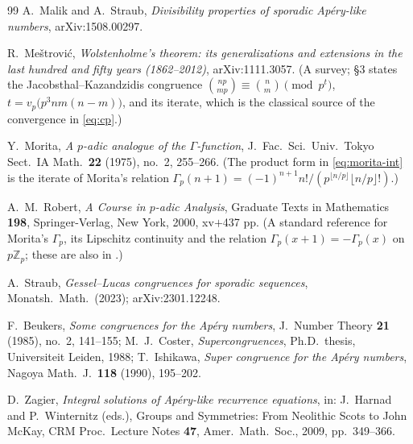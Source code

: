 \documentclass[11pt,reqno]{article}
\newcommand{\Zp}{\mathbb{Z}_p}
\newcommand{\Gp}{\Gamma_p}
\newcommand{\vp}{v_p}
\newcommand{\bin}[2]{\binom{#1}{#2}}
\newcommand{\floor}[1]{\lfloor #1 \rfloor}
\theoremstyle{plain}
\theoremstyle{definition}
\theoremstyle{remark}
\numberwithin{equation}{section}
\begin{document}
\begin{thebibliography}{99}
A.~Malik and A.~Straub,
\emph{Divisibility properties of sporadic Ap\'ery-like numbers},
arXiv:1508.00297.

R.~Me\v{s}trovi\'c,
\emph{Wolstenholme's theorem: its generalizations and extensions in the last
hundred and fifty years (1862--2012)},
arXiv:1111.3057.
(A survey; \S3 states the Jacobsthal--Kazandzidis congruence
$\bin{np}{mp}\equiv\bin nm\pmod{p^{t}}$, $t=\vp\bigl(p^3nm(n-m)\bigr)$, and its
iterate, which is the classical source of the convergence in \eqref{eq:cp}.)

Y.~Morita,
\emph{A $p$-adic analogue of the $\Gamma$-function},
J.\ Fac.\ Sci.\ Univ.\ Tokyo Sect.\ IA Math.\ \textbf{22} (1975), no.~2,
255--266.
(The product form in \eqref{eq:morita-int} is the iterate of Morita's relation
$\Gp(n+1)=(-1)^{n+1}n!/(p^{\floor{n/p}}\floor{n/p}!)$.)

A.~M.~Robert,
\emph{A Course in $p$-adic Analysis},
Graduate Texts in Mathematics \textbf{198}, Springer-Verlag, New York, 2000,
xv$+$437 pp.
(A standard reference for Morita's $\Gp$, its Lipschitz continuity and the
relation $\Gp(x+1)=-\Gp(x)$ on $p\Zp$; these are also in \cite{Morita1975}.)

A.~Straub,
\emph{Gessel--Lucas congruences for sporadic sequences},
Monatsh.\ Math.\ (2023); arXiv:2301.12248.

F.~Beukers,
\emph{Some congruences for the Ap\'ery numbers},
J.\ Number Theory \textbf{21} (1985), no.~2, 141--155;
M.~J.~Coster,
\emph{Supercongruences},
Ph.D.\ thesis, Universiteit Leiden, 1988;
T.~Ishikawa,
\emph{Super congruence for the Ap\'ery numbers},
Nagoya Math.\ J.\ \textbf{118} (1990), 195--202.

D.~Zagier,
\emph{Integral solutions of Ap\'ery-like recurrence equations},
in: J.~Harnad and P.~Winternitz (eds.), Groups and Symmetries:
From Neolithic Scots to John McKay,
CRM Proc.\ Lecture Notes \textbf{47}, Amer.\ Math.\ Soc., 2009, pp.~349--366.

\end{thebibliography}
\end{document}
